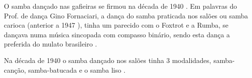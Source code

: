 
O samba dançado nas gafieiras se firmou na década de 1940 \cite[pp. 142]{perna2002samba}. 
Em palavras do Prof. de dança Gino Fornaciari, 
a dança do samba praticada nos salões ou samba carioca (anterior a 1947 \cite[pp. 50]{fornaciari1947aprender}), 
 tinha um parecido com o Foxtrot e a Rumba, se dançava numa música sincopada com compasso binário,
sendo esta dança a preferida do mulato brasileiro
\cite[pp. 50-51]{fornaciari1947aprender}.


Na década de 1940 o samba dançado nos salões 
tinha 3 modalidades, samba-canção, samba-batucada e o samba liso \cite[pp. 58]{freitas1959danca} \cite[pp. 142-143]{perna2002samba} 
\cite[pp. 51]{fornaciari1947aprender}\cite[pp. 51]{fornaciari1950aprender}.\\
